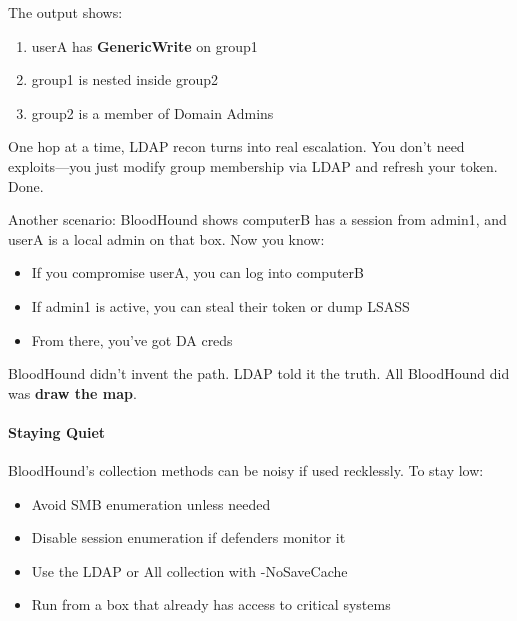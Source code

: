 The output shows:

\begin{enumerate}
    \item userA has \textbf{GenericWrite} on group1

    \item group1 is nested inside group2

    \item group2 is a member of Domain Admins

\end{enumerate}

One hop at a time, LDAP recon turns into real escalation. You don’t need exploits—you just modify group membership via LDAP and refresh your token. Done.

Another scenario: BloodHound shows computerB has a session from admin1, and userA is a local admin on that box. Now you know:

\begin{itemize}
    \item If you compromise userA, you can log into computerB

    \item If admin1 is active, you can steal their token or dump LSASS

    \item From there, you’ve got DA creds

\end{itemize}
BloodHound didn’t invent the path. LDAP told it the truth. All BloodHound did was \textbf{draw the map}.

\paragraph{\textbf{   Staying Quiet}}

BloodHound’s collection methods can be noisy if used recklessly. To stay low:

\begin{itemize}
    \item Avoid SMB enumeration unless needed

    \item Disable session enumeration if defenders monitor it

    \item Use the LDAP or All collection with -NoSaveCache

    \item Run from a box that already has access to critical systems

\end{itemize}


